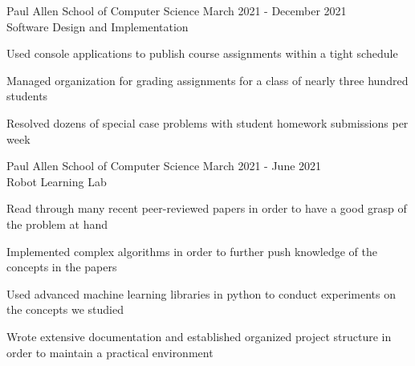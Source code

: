 \documentclass[10pt]{article}
\newenvironment{itemize*}
{\begin{itemize}[leftmargin=*]
    \setlength{\parskip}{0.5pt}}
{\end{itemize}}
\begin{document}
\begin{description}[leftmargin=!,
                    labelwidth=\widthof{\bfseries Teaching Assistant}]

\item[Teaching Assistant] Paul Allen School of Computer Science \hfill 
    March 2021 - December 2021\\
    Software Design and Implementation
\end{description}
\begin{itemize*}
\item Used console applications to publish course assignments within a tight
      schedule
\item Managed organization for grading assignments for a class of nearly three
      hundred students
\item Resolved dozens of special case problems with student homework
      submissions per week
\end{itemize*}
\vspace{10pt}

\begin{description}[leftmargin=!,
                    labelwidth=\widthof{\bfseries Teaching Assistant}]

\item[Research Assistant] Paul Allen School of Computer Science \hfill
    March 2021 - June 2021\\ Robot Learning Lab
\end{description}
\begin{itemize*}
\item Read through many recent peer-reviewed papers in order to have a good
      grasp of the problem at hand
\item Implemented complex algorithms in order to further push knowledge of the
      concepts in the papers
\item Used advanced machine learning libraries in python to conduct experiments
      on the concepts we studied
\item Wrote extensive documentation and established organized project structure
      in order to maintain a practical environment
\end{itemize*}
\end{document}
